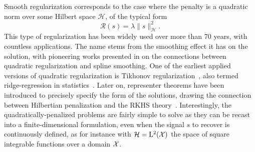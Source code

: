 \documentclass[12pt]{article}
\begin{document}
    Smooth regularization corresponds to the case where the penalty is a quadratic norm over some Hilbert space $\mathcal{H}$, of the typical form 
    \begin{equation*}
        \mathcal{R} (s) = \lambda \| s \|_{\mathcal{H}}^2.
    \end{equation*}
    This type of regularization has been widely used over more than 70 years, with countless applications. The name stems from the smoothing effect it has on the solution, with pioneering works presented in \cite{Kimeldorf1970}
    on the connections between quadratic regularization and spline smoothing. %
    One of the earliest applied versions of quadratic regularization is Tikhonov regularization~\cite{tikhonov1963solution}, also termed ridge-regression in statistics~\cite{Hoerl1962ridge}.  %
    Later on, representer theorems have been introduced to precisely specify the form of the solutions, drawing the connection between Hilbertian penalization and the RKHS theory~\cite{Scholkopf2001generalized}. Interestingly, the quadratically-penalized problems are fairly simple to solve as they can be recast into a finite-dimensional formulation, even when the signal $s$ to recover is continuously defined, as for instance with $\mathcal{H} = \mathrm{L}^2(\mathcal{X})$ the space of square integrable functions over a domain $\mathcal{X}$. 
\end{document}
